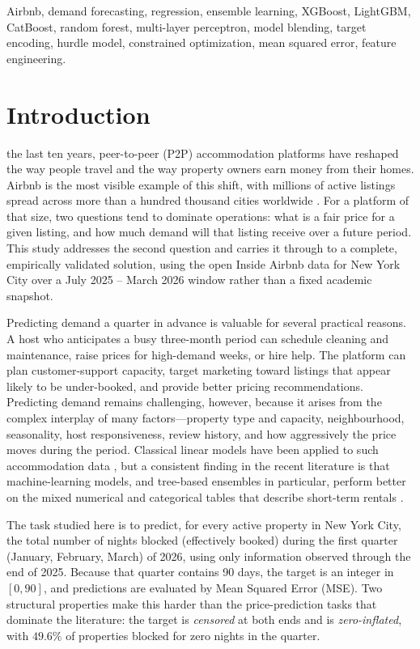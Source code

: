 \documentclass[journal]{IEEEtran}
\begin{document}
\begin{IEEEkeywords}
Airbnb, demand forecasting, regression, ensemble learning, XGBoost, LightGBM,
CatBoost, random forest, multi-layer perceptron, model blending, target
encoding, hurdle model, constrained optimization, mean squared error, feature
engineering.
\end{IEEEkeywords}

\section{Introduction}
 the last ten years, peer-to-peer (P2P) accommodation
platforms have reshaped the way people travel and the way property owners earn
money from their homes. Airbnb is the most visible example of this shift, with
millions of active listings spread across more than a hundred thousand cities
worldwide \cite{adamiak2018}. For a platform of that size, two questions tend
to dominate operations: what is a fair price for a given listing, and how much
demand will that listing receive over a future period. This study addresses the
second question and carries it through to a complete, empirically validated
solution, using the open Inside Airbnb data \cite{insideairbnb} for New York
City over a July 2025 -- March 2026 window rather than a fixed academic
snapshot.

Predicting demand a quarter in advance is valuable for several practical
reasons. A host who anticipates a busy three-month period can schedule cleaning
and maintenance, raise prices for high-demand weeks, or hire help. The platform
can plan customer-support capacity, target marketing toward listings that appear
likely to be under-booked, and provide better pricing recommendations.
Predicting demand remains challenging, however, because it arises from the
complex interplay of many factors---property type and capacity, neighbourhood,
seasonality, host responsiveness, review history, and how aggressively the price
moves during the period. Classical linear models have been applied to such
accommodation data \cite{gunter2018,wang2017}, but a consistent finding in the
recent literature is that machine-learning models, and tree-based ensembles in
particular, perform better on the mixed numerical and categorical tables that
describe short-term rentals \cite{tang2024,camatti2024,kalehbasti2019}.

The task studied here is to predict, for every active property in New York
City, the total number of nights blocked (effectively booked) during the first
quarter (January, February, March) of 2026, using only information observed
through the end of 2025. Because that quarter contains 90 days, the target is
an integer in $[0,90]$, and predictions are evaluated by Mean Squared Error
(MSE). Two structural properties make this harder than the price-prediction
tasks that dominate the literature: the target is \emph{censored} at both ends
and is \emph{zero-inflated}, with $49.6\%$ of properties blocked for zero
nights in the quarter.
\end{document}
